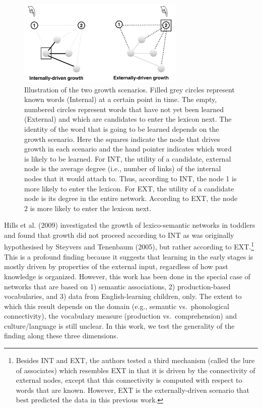 \documentclass[english,floatsintext,man]{apa6}
\theoremstyle{definition}
\theoremstyle{definition}
\theoremstyle{definition}
\theoremstyle{remark}
\begin{document}
\begin{figure}

{\centering \includegraphics[width=300px]{figs/growth3} 

}

\caption{Illustration of the two growth scenarios. Filled grey circles represent known words (Internal) at a certain point in time. The empty, numbered circles represent words that have not yet been learned (External) and which are candidates to enter the lexicon next. The identity of the word that is going to be learned depends on the growth scenario.  Here the squares indicate the node that drives growth in each scenario and the hand pointer indicates which word is likely to be learned. For INT, the utility of a candidate, external node is the average degree (i.e., number of links) of the internal nodes that it would attach to. Thus, according to INT, the node 1 is more likely to enter the lexicon. For EXT, the utility of a candidate node is its degree in the entire network. According to EXT, the node 2 is more likely to enter the lexicon next.}\label{fig:growth}
\end{figure}

Hills et al. (2009) investigated the growth of lexico-semantic networks
in toddlers and found that growth did not proceed according to INT as
was originally hypothesised by Steyvers and Tenenbaum (2005), but rather
according to
EXT.\footnote{Besides INT and EXT, the authors tested a third mechanism (called the lure of associates) which resembles EXT in that it is driven by the connectivity of external nodes, except that this connectivity is computed with respect to words that are known. However, EXT is the externally-driven scenario that best predicted the data in this previous work.}
This is a profound finding because it suggests that learning in the
early stages is mostly driven by properties of the external input,
regardless of how past knowledge is organized. However, this work has
been done in the special case of networks that are based on 1) semantic
associations, 2) production-based vocabularies, and 3) data from
English-learning children, only. The extent to which this result depends
on the domain (e.g., semantic vs.~phonological connectivity), the
vocabulary measure (production vs.~comprehension) and culture/language
is still unclear. In this work, we test the generality of the finding
along these three dimensions.
\end{document}
